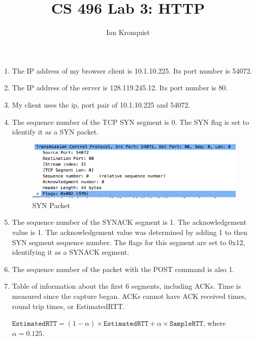 \documentclass[12pt]{article}
\title{CS 496 Lab 3: HTTP}
\author{Ian Kronquist}
\begin{document}
\maketitle

\begin{enumerate}
    \item The IP address of my browser client is 10.1.10.225. Its port number is 54072.
    \item The IP address of the server is 128.119.245.12. Its port number is 80.
    \item My client uses the ip, port pair of 10.1.10.225 and 54072.
    \item The sequence number of the TCP SYN segment is 0. The SYN flag is set to identify it as a SYN packet.
\begin{figure}[!ht]
    \includegraphics[scale=0.5]{./synpacket.png}
    \caption{SYN Packet}
\end{figure}


    \item The sequence number of the SYNACK segment is 1. The acknowledgement value is 1. The acknowledgement value was determined by adding 1 to then SYN segment sequence number. The flags for this segment are set to 0x12, identifying it as a SYNACK segment.
    \item The sequence number of the packet with the POST command is also 1.
    \item Table of information about the first 6 segments, including ACKs. Time is measured since the capture began. ACKs cannot have ACK received times, round trip times, or EstimatedRTT.



        $\texttt{EstimatedRTT} = (1 - \alpha ) \times \texttt{EstimatedRTT} + \alpha \times \texttt{SampleRTT}$, where $\alpha = 0.125$.



\end{enumerate}
\end{document}
